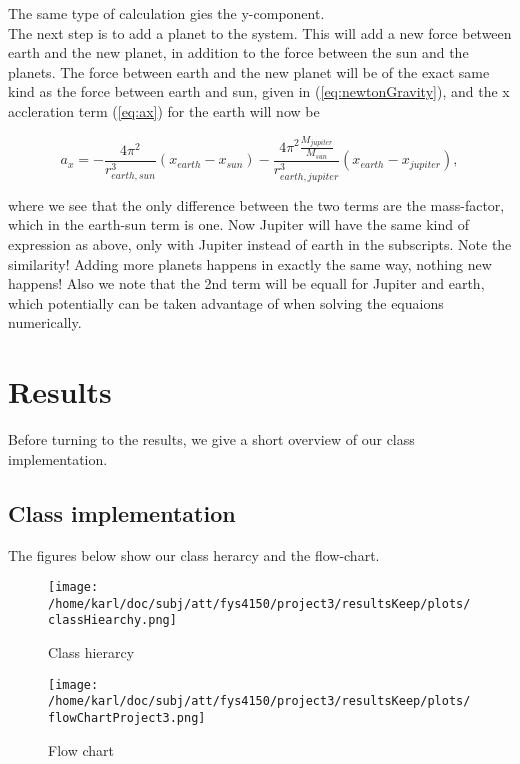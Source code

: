 \documentclass{article}
\begin{document}
The same type of calculation gies the y-component. \\

The next step is to add a planet to the system. This will add a new force between earth and the new planet, in addition to the force between the sun and the planets. The force between earth and the new planet will be of the exact same kind as the force between earth and sun, given in (\ref{eq:newtonGravity}), and the x accleration term (\ref{eq:ax}) for the earth will now be

\begin{equation}\label{eq:3rdPlanet}
a_x = -\frac{4 \pi^2}{r_{earth,sun}^3} (x_{earth}-x_{sun}) - \frac{4 \pi^2 \frac{M_{jupiter}}{M_{sun}}}{r_{earth,jupiter}^3}(x_{earth}-x_{jupiter}),
\end{equation}

where we see that the only difference between the two terms are the mass-factor, which in the earth-sun term is one. Now Jupiter will have the same kind of expression as above, only with Jupiter instead of earth in the subscripts. Note the similarity! Adding more planets happens in exactly the same way, nothing new happens! Also we note that the 2nd term will be equall for Jupiter and earth, which potentially can be taken advantage of when solving the equaions numerically. 


\section{Results}
Before turning to the results, we give a short overview of our class implementation.

\subsection{Class implementation}
The figures below show our class herarcy and the flow-chart.

\begin{figure}[H]
		\centering
		\texttt{[image: /home/karl/doc/subj/att/fys4150/project3/resultsKeep/plots/classHiearchy.png]}
		\caption{Class hierarcy}
		\label{1}
\end{figure}

\begin{figure}[H]
		\centering
		\texttt{[image: /home/karl/doc/subj/att/fys4150/project3/resultsKeep/plots/flowChartProject3.png]}
		\caption{Flow chart}
		\label{1}
\end{figure}
\end{document}
